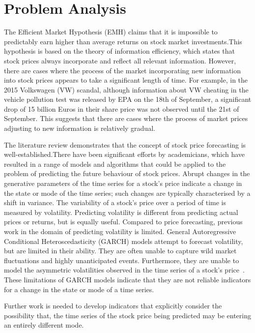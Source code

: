 \documentclass[13pt]{report}
\begin{document}
\chapter{Problem Analysis}
The Efficient Market Hypothesis (EMH) claims that it is impossible to predictably earn higher than average returns on stock market investments.This hypothesis is based on the theory of information efficiency, which states that stock prices always incorporate and reflect all relevant information. However, there are cases where the process of the market incorporating new information into stock prices appears to take a significant length of time. For example, in the 2015 Volkswagen (VW) scandal, although information about VW cheating in the vehicle pollution test was released by EPA on the 18th of September, a significant drop of 15 billion Euros in their share price was not observed until the 21st of September. This suggests that there are cases where the  process of market prices adjusting to new information is relatively gradual.

The literature review demonstrates that the concept of stock price forecasting is well-established.There have been significant efforts by academicians, which have resulted in a range of models and algorithms that could be applied to the problem of predicting the future behaviour of stock prices. Abrupt changes in the generative parameters of the time series for a stock's price indicate a change in the state or mode of the time series; such changes are typically characterised by a shift in variance\cite{gil2012methods}. The variability of a stock's price over a period of time is measured by volatility. Predicting volatility is different from predicting actual prices or returns, but is equally useful. Compared to price forecasting, previous work in the domain of predicting volatility is limited. General Autoregressive Conditional Heteroscedasticity (GARCH) models attempt to forecast volatility, but are limited in their ability. They are often unable to capture wild market fluctuations and highly unanticipated events. Furthermore, they are unable to model the asymmetric volatilities observed in the time series of a stock's price~\cite{satchell2011forecasting}. These limitations of GARCH models indicate that they are not reliable indicators for a change in the state or mode of a time series. 

Further work is needed to develop indicators that explicitly consider the possibility that, the time series of the stock price being predicted may be entering an entirely different mode.
\end{document}
